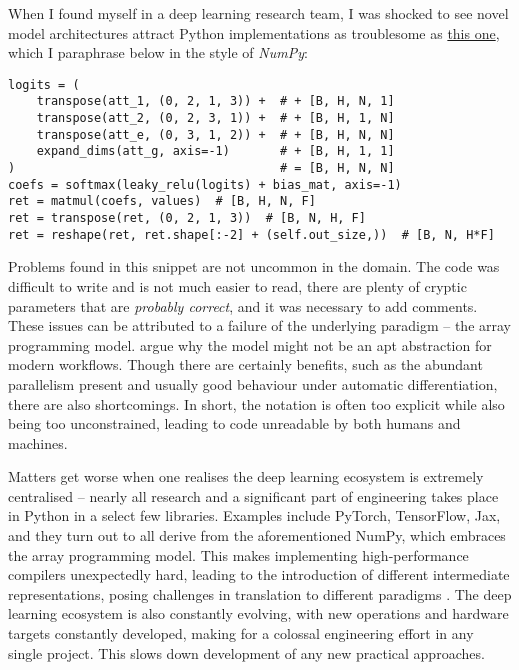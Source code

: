 When I found myself in a deep learning research team, I was shocked to see novel model architectures attract Python implementations as troublesome as \href{https://github.com/google-deepmind/clrs/blob/8697f51663bd77548f4b3108816c84d163883361/clrs/_src/processors.py#L140}{this one}, which I paraphrase below in the style of \textit{NumPy}:
\begin{center} \begin{minipage}{0.65\textwidth}
\begin{verbatim}
logits = (
    transpose(att_1, (0, 2, 1, 3)) +  # + [B, H, N, 1]
    transpose(att_2, (0, 2, 3, 1)) +  # + [B, H, 1, N]
    transpose(att_e, (0, 3, 1, 2)) +  # + [B, H, N, N]
    expand_dims(att_g, axis=-1)       # + [B, H, 1, 1]
)                                     # = [B, H, N, N]
coefs = softmax(leaky_relu(logits) + bias_mat, axis=-1)
ret = matmul(coefs, values)  # [B, H, N, F]
ret = transpose(ret, (0, 2, 1, 3))  # [B, N, H, F]
ret = reshape(ret, ret.shape[:-2] + (self.out_size,))  # [B, N, H*F]
\end{verbatim}
\end{minipage} \end{center}
Problems found in this snippet are not uncommon in the domain. The code was difficult to write and is not much easier to read, there are plenty of cryptic parameters that are \textit{probably correct}, and it was necessary to add comments. These issues can be attributed to a failure of the underlying paradigm -- the array programming model. \textcite{paszke2021getting} argue why the model might not be an apt abstraction for modern workflows. Though there are certainly benefits, such as the abundant parallelism present and usually good behaviour under automatic differentiation, there are also shortcomings. In short, the notation is often too explicit while also being too unconstrained, leading to code unreadable by both humans and machines. 

Matters get worse when one realises the deep learning ecosystem is extremely centralised -- nearly all research and a significant part of engineering takes place in Python in a select few libraries. Examples include PyTorch, TensorFlow, Jax, and they turn out to all derive from the aforementioned NumPy, which embraces the array programming model. 
This makes implementing high-performance compilers unexpectedly hard, leading to the introduction of different intermediate representations, posing challenges in translation to different paradigms \cite{feng2023tensorir}. The deep learning ecosystem is also constantly evolving, with new operations and hardware targets constantly developed, making for a colossal engineering effort in any single project. This slows down development of any new practical approaches.

